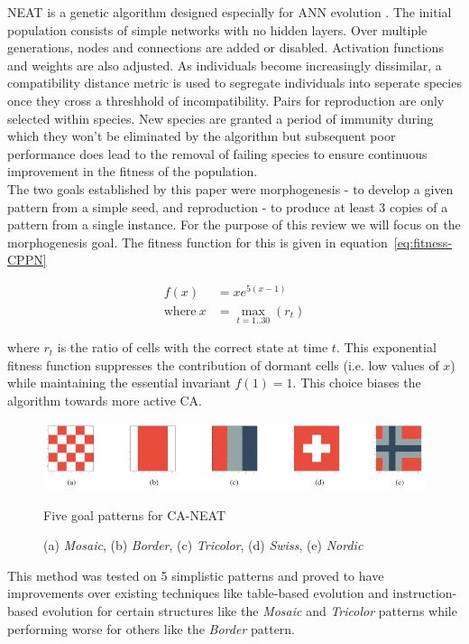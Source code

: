 NEAT is a genetic algorithm designed especially for ANN evolution \cite{stanley2002evolving}.
The initial population consists of simple networks with no hidden layers.
Over multiple generations, nodes and connections are added or disabled.
Activation functions and weights are also adjusted.
As individuals become increasingly dissimilar, a compatibility distance metric is used to segregate individuals into seperate species once they cross a threshhold of incompatibility.
Pairs for reproduction are only selected within species.
New species are granted a period of immunity during which they won't be eliminated by the algorithm but subsequent poor performance does lead to the removal of failing species to ensure continuous improvement in the fitness of the population.\\

The two goals established by this paper were morphogenesis - to develop a given pattern from a simple seed, and reproduction - to produce at least 3 copies of a pattern from a single instance.
For the purpose of this review we will focus on the morphogenesis goal.
The fitness function for this is given in equation~\ref{eq:fitness-CPPN}

\begin{align}
\label{eq:fitness-CPPN}
f(x) &= xe^{5(x-1)} \\
\text{where}~x &= \max_{t = 1 .. 30} (r_t)
\end{align}

\noindent
where $r_t$ is the ratio of cells with the correct state at time $t$.
This exponential fitness function suppresses the contribution of dormant cells (i.e. low values of $x$) while maintaining the essential invariant $f(1) = 1$.
This choice biases the algorithm towards more active CA.\\


\begin{figure}[!h]
    \centering
    \includegraphics[width=5in]{related_works/five-flags.png}
    \caption{Five goal patterns for CA-NEAT}
    \caption*{(a) \textit{Mosaic}, (b) \textit{Border}, (c) \textit{Tricolor}, (d) \textit{Swiss}, (e) \textit{Nordic}}
    \label{fig:five-flags}
\end{figure}

This method was tested on 5 simplistic patterns and proved to have improvements over existing techniques like table-based evolution and instruction-based evolution \cite{nichele2014evolutionary} for certain structures like the \textit{Mosaic} and \textit{Tricolor} patterns while performing worse for others like the \textit{Border} pattern.\\

